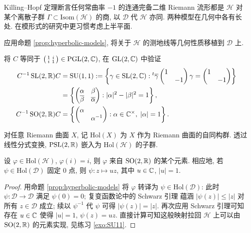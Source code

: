 Killing--Hopf 定理断言任何常曲率 $-1$ 的连通完备二维 Riemann 流形都是 $\mathcal{H}$ 对某个离散子群 $\Gamma \subset \text{Isom}(\mathcal{H})$ 的商, 以 $\mathcal{D}$ 代 $\mathcal{H}$ 亦同. 两种模型在几何中各有长处. 在模形式的研究中更习惯考虑上半平面.

\begin{exercise}
	应用命题 \ref{prop:hyperbolic-models}, 将关于 $\mathcal{H}$ 的测地线等几何性质移植到 $\mathcal{D}$ 上.
\end{exercise}

\begin{exercise}\label{exo:SU11}
	将 $C$ 等同于 $\bigl(\begin{smallmatrix} 1 & i \\ i & 1 \end{smallmatrix}\bigr) \in \operatorname{PGL}(2,\mathbb{C})$, 在 $\operatorname{GL}(2, \mathbb{C})$ 中验证
	\begin{align*}
		C^{-1} \operatorname{SL}(2, \mathbb{R}) C & = \operatorname{SU}(1, 1) := \left\{ \gamma \in \operatorname{SL}(2,\mathbb{C}): {}^t \overline{\gamma} \begin{pmatrix} 1 &  \\  & -1 \end{pmatrix} \gamma = \begin{pmatrix} 1 &  \\  & -1 \end{pmatrix} \right\} \\
		& = \left\{ \begin{pmatrix} \alpha & \beta \\ \overline{\beta} & \overline{\alpha} \end{pmatrix} : |\alpha|^2 - |\beta|^2 = 1 \right\}, \\
		C^{-1} \operatorname{SO}(2, \mathbb{R}) C & = \left\{ \begin{pmatrix} \alpha &  \\  & \alpha^{-1} \end{pmatrix} : \alpha \in \mathbb{C}^\times, \; |\alpha|=1 \right\}.
	\end{align*}
\end{exercise}

对任意 Riemann 曲面 $X$, 记 $\mathrm{Hol}(X)$ 为 $X$ 作为 Riemann 曲面的自同构群. 透过线性分式变换, $\operatorname{PSL}(2,\mathbb{R})$ 嵌入为 $\mathrm{Hol}(\mathcal{H})$ 的子群.
\begin{lemma}\label{prop:Schwarz-variant}
	设 $\varphi \in \mathrm{Hol}(\mathcal{H})$, $\varphi(i)=i$, 则 $\varphi$ 来自 $\operatorname{SO}(2,\mathbb{R})$ 的某个元素. 相应地, 若 $\psi \in \mathrm{Hol}(\mathcal{D})$ 固定 $0$ 点, 则 $\psi: z \mapsto uz$, 其中 $u \in \mathbb{C}$, $|u|=1$.
\end{lemma}
\begin{proof}
	用命题 \ref{prop:hyperbolic-models} 将 $\varphi$ 转译为 $\psi \in \mathrm{Hol}(\mathcal{D})$: 此时 $\psi: \mathcal{D} \to \mathcal{D}$ 满足 $\psi(0)=0$; 复变函数论中的 Schwarz 引理 \cite[\S 3.7, 定理 1]{TW06} 蕴涵 $|\psi(z)| \leq |z|$ 对所有 $z \in \mathcal{D}$ 成立; 续以 $\psi^{-1}$ 代 $\psi$ 可得 $|\psi(z)| = |z|$. 再次应用 Schwarz 引理可知存在 $u \in \mathbb{C}$ 使得 $|u|=1$, $\psi(z) = uz$. 直接计算可知这般映射拉回 $\mathcal{H}$ 上可以由 $\operatorname{SO}(2,\mathbb{R})$ 的元素实现, 见练习 \ref{exo:SU11}.
\end{proof}

